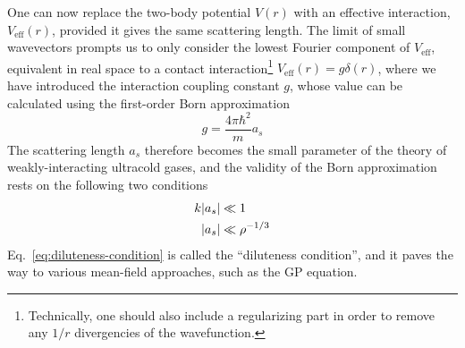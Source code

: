 One can now replace the two-body potential $V(r)$ with an effective
interaction, $V_{\text{eff}}(r)$, provided it gives the same
scattering length. The limit of small wavevectors prompts us to only
consider the lowest Fourier component of $V_{\text{eff}}$, equivalent
in real space to a contact interaction\footnote{Technically, one
  should also include a regularizing part in order to remove any $1/r$
  divergencies of the wavefunction.}
$V_{\text{eff}}(r) = g \delta(r)$, where we have introduced the
interaction coupling constant $g$, whose value can be calculated using
the first-order Born approximation~\cite{9780198507192} 
%
\begin{equation}\label{eq:g-constant}
  g = \frac{4\pi\hbar^2}{m} a_s
\end{equation}
% 
The scattering length $a_s$ therefore becomes the small parameter of
the theory of weakly-interacting ultracold gases, and the validity of
the Born approximation rests on the following two conditions
%
\begin{align}
  k \vert a_s \vert & \ll 1\\
    \vert a_s \vert & \ll \rho^{-1/3}\label{eq:diluteness-condition}
\end{align}
% 
Eq.~\eqref{eq:diluteness-condition} is called the ``diluteness
condition'', and it paves the way to various mean-field approaches,
such as the GP equation.



